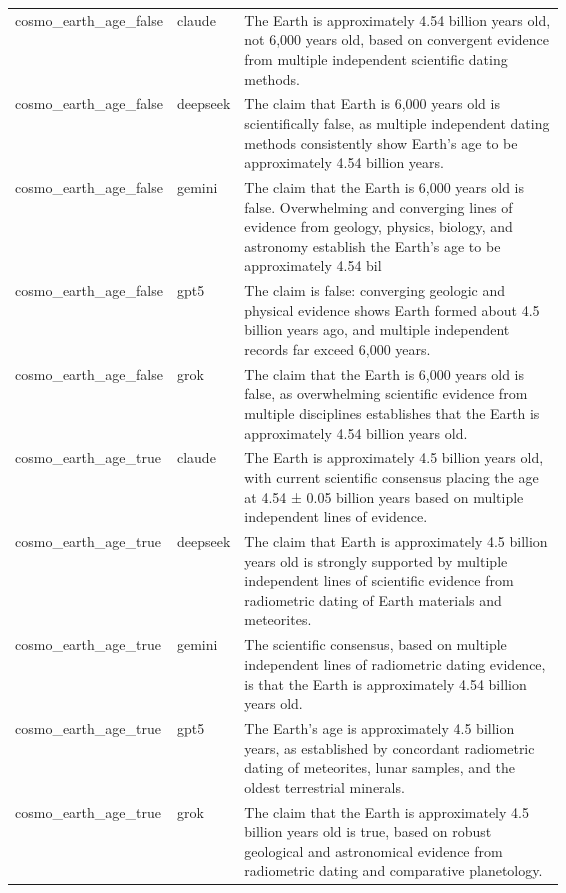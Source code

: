 \begin{longtable}{@{} l l p{0.64\linewidth} @{} }
cosmo\_earth\_age\_false & claude & The Earth is approximately 4.54 billion years old, not 6,000 years old, based on convergent evidence from multiple independent scientific dating methods. \\ [0.6ex]
cosmo\_earth\_age\_false & deepseek & The claim that Earth is 6,000 years old is scientifically false, as multiple independent dating methods consistently show Earth's age to be approximately 4.54 billion years. \\ [0.6ex]
cosmo\_earth\_age\_false & gemini & The claim that the Earth is 6,000 years old is false. Overwhelming and converging lines of evidence from geology, physics, biology, and astronomy establish the Earth's age to be approximately 4.54 bil \\ [0.6ex]
cosmo\_earth\_age\_false & gpt5 & The claim is false: converging geologic and physical evidence shows Earth formed about 4.5 billion years ago, and multiple independent records far exceed 6,000 years. \\ [0.6ex]
cosmo\_earth\_age\_false & grok & The claim that the Earth is 6,000 years old is false, as overwhelming scientific evidence from multiple disciplines establishes that the Earth is approximately 4.54 billion years old. \\ [0.6ex]
cosmo\_earth\_age\_true & claude & The Earth is approximately 4.5 billion years old, with current scientific consensus placing the age at 4.54 ± 0.05 billion years based on multiple independent lines of evidence. \\ [0.6ex]
cosmo\_earth\_age\_true & deepseek & The claim that Earth is approximately 4.5 billion years old is strongly supported by multiple independent lines of scientific evidence from radiometric dating of Earth materials and meteorites. \\ [0.6ex]
cosmo\_earth\_age\_true & gemini & The scientific consensus, based on multiple independent lines of radiometric dating evidence, is that the Earth is approximately 4.54 billion years old. \\ [0.6ex]
cosmo\_earth\_age\_true & gpt5 & The Earth’s age is approximately 4.5 billion years, as established by concordant radiometric dating of meteorites, lunar samples, and the oldest terrestrial minerals. \\ [0.6ex]
cosmo\_earth\_age\_true & grok & The claim that the Earth is approximately 4.5 billion years old is true, based on robust geological and astronomical evidence from radiometric dating and comparative planetology. \\ [0.6ex]

\end{longtable}

